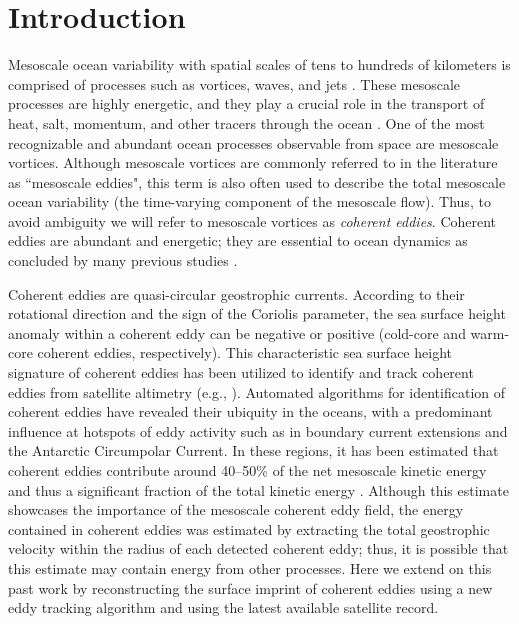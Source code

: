 \documentclass[draft,linenumbers]{agujournal2019}
\begin{document}
\section{Introduction}

Mesoscale ocean variability with spatial scales of tens to hundreds of kilometers is comprised of processes such as vortices, waves, and jets \citep{Ferrari_energy_2009, Fu_Eddy_2010}. 
These mesoscale processes are highly energetic, and they play a crucial role in the transport of heat, salt, momentum, and other tracers through the ocean \citep{Gill_Energy_1974, Wyrtki_Eddy_1976, Wunsch_energetics_2004}. One of the most recognizable and abundant ocean processes observable from space are mesoscale vortices. Although mesoscale vortices are commonly referred to in the literature as ``mesoscale eddies", this term is also often used to describe the total mesoscale ocean variability (the time-varying component of the mesoscale flow). Thus, to avoid ambiguity we will refer to mesoscale vortices as \emph{coherent eddies}. Coherent eddies are abundant and energetic; they are essential to ocean dynamics as concluded by many previous studies \citep{Hogg_Interdecadal_2006,Siegel_Bio_2011,BeronVera_Agulhas_2013,Frenger_Imprint_2013,Frenger_Southern_2015,Pilo_eddy_2015,Schubert_submesoscale_2019,Patel_SO_eddies_2020}.


Coherent eddies are quasi-circular geostrophic currents. According to their rotational direction and the sign of the Coriolis parameter, the sea surface height anomaly within a coherent eddy can be negative or positive (cold-core and warm-core coherent eddies, respectively). 
This characteristic sea surface height signature of coherent eddies has been utilized to identify and track coherent eddies from satellite altimetry (e.g., \citealp{Chelton_Global_2007, Faghmous_A_2015, Ashkezari_eddies_2016,Martinez_TKE_2019, Cui_eddy_identification_2020}). 
Automated algorithms for identification of coherent eddies have revealed their ubiquity in the oceans, with a predominant influence at hotspots of eddy activity such as in boundary current extensions and the Antarctic Circumpolar Current. In these regions, it has been estimated that coherent eddies contribute around 40--50\% of the net mesoscale kinetic energy \citep{Chelton_The_2011} and thus a significant fraction of the total kinetic energy \citep{Ferrari_energy_2009}. 
Although this estimate showcases the importance of the mesoscale coherent eddy field, the energy contained in coherent eddies was estimated by extracting the total geostrophic velocity within the radius of each detected coherent eddy; thus, it is possible that this estimate may contain energy from other processes. 
Here we extend on this past work by reconstructing the surface imprint of coherent eddies using a new eddy tracking algorithm and using the latest  available satellite record.
\end{document}
